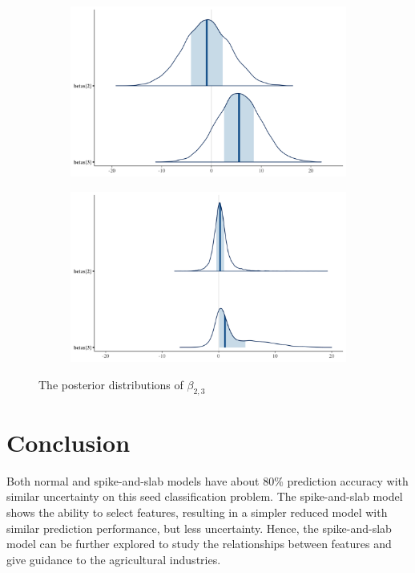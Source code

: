 \documentclass[12pt]{article}
\begin{document}
\begin{figure}[ht]
    \centering
    \begin{subfigure}[b]{0.45\textwidth}
        \centering
        \includegraphics[width=\linewidth]{figures/post_beta_23_normal.png}
        \label{fig:3a}
    \end{subfigure}
    \hfill
    \begin{subfigure}[b]{0.45\textwidth}
        \centering
        \includegraphics[width=\linewidth]{figures/post_beta23_sas.png}
        \label{fig:3b}
    \end{subfigure}
    
    \caption{The posterior distributions of $\beta_{2,3}$}
    \label{fig:post_23}
\end{figure}

\section{Conclusion}
Both normal and spike-and-slab models have about 80\% prediction accuracy with similar uncertainty on this seed classification problem. The spike-and-slab model shows the ability to select features, resulting in a simpler reduced model with similar prediction performance, but less uncertainty. Hence, the spike-and-slab model can be further explored to study the relationships between features and give guidance to the agricultural industries.    
\end{document}
